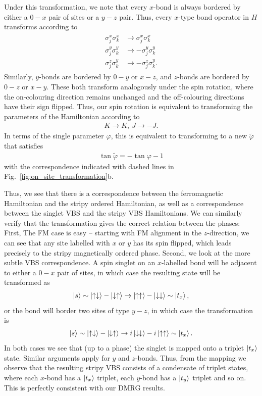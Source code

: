 Under this transformation, we note that every $x$-bond is always bordered by either a $0 - x$ pair of sites or a $y-z$ pair. Thus, every $x$-type bond operator in $H$ transforms according to
\begin{align}
    \begin{aligned}
        \sigma_j^x\sigma_k^x &\rightarrow \sigma_j^x\sigma_k^x \\
        \sigma_j^y\sigma_k^y &\rightarrow -\sigma_j^y\sigma_k^y \\
        \sigma_j^z\sigma_k^y &\rightarrow -\sigma_j^z\sigma_k^y.
    \end{aligned}
\end{align}
Similarly, $y$-bonds are bordered by $0-y$ or $x-z$, and $z$-bonds are bordered by $0-z$ or $x-y$. These both transform analogously under the spin rotation, where the on-colouring direction remains unchanged and the off-colouring directions have their sign flipped. Thus, our spin rotation is equivalent to transforming the parameters of the Hamiltonian according to
\begin{align}
    K \rightarrow K,\ J \rightarrow -J.
\end{align}
In terms of the single parameter $\varphi$, this is equivalent to transforming to a new $\tilde \varphi$ that satisfies
\begin{align}
     \tan \tilde \varphi = -\tan \varphi - 1
\end{align}
with the correspondence indicated with dashed lines in Fig.~\ref{fig:on_site_transformation}b.

Thus, we see that there is a correspondence between the ferromagnetic Hamiltonian and the stripy ordered Hamiltonian, as well as a correspondence between the singlet VBS and the stripy VBS Hamiltonians. We can similarly verify that the transformation gives the correct relation between the phases: 
First, The FM case is easy -- starting with FM alignment in the $z$-direction, we can see that any site labelled with $x$ or $y$ has its spin flipped, which leads precisely to the stripy magnetically ordered phase. Second, we look at the more subtle VBS correspondence. A spin singlet on an $x$-labelled bond will be adjacent to either a $0-x$ pair of sites, in which case the resulting state will be transformed as
\begin{align}
    \ket s  \sim 
    \ket{\uparrow \downarrow} - \ket{\downarrow \uparrow} 
    \rightarrow 
    \ket{\uparrow \uparrow} - \ket{\downarrow \downarrow} 
    \sim \ket{t_x},
\end{align}
or the bond will border two sites of type $y-z$, in which case the transformation is
\begin{align}
    \ket s  \sim 
    \ket{\uparrow \downarrow} - \ket{\downarrow \uparrow} 
    \rightarrow 
    i \ket{\downarrow \downarrow} - i \ket{\uparrow \uparrow} 
    \sim \ket{t_x}.
\end{align}
In both cases we see that (up to a phase) the singlet is mapped onto a triplet $\ket{t_x}$ state. Similar arguments apply for $y$ and $z$-bonds. Thus, from the mapping we observe that the resulting stripy VBS consists of a condensate of triplet states, where each $x$-bond has a $\ket{t_x}$ triplet, each $y$-bond has a $\ket{t_y}$ triplet and so on. This is perfectly consistent with our DMRG results. 